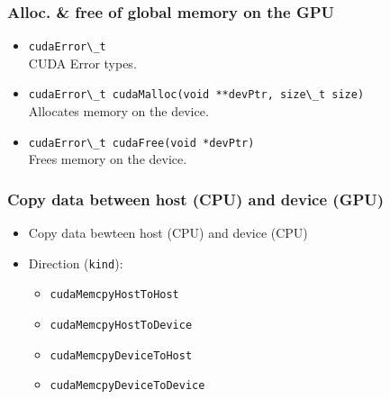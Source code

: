 \begin{frame}
   \frametitle{Alloc. \& free of global memory on the GPU}
   \begin{itemize}
         \item \lstinline[style=MyCudaStyle]|cudaError\_t| \\
		 CUDA Error types.
	 \item \lstinline[style=MyCudaStyle]|cudaError\_t cudaMalloc(void **devPtr, size\_t size)| \\
		 Allocates memory on the device.
	 \item \lstinline[style=MyCudaStyle]|cudaError\_t cudaFree(void *devPtr)| \\
		 Frees memory on the device.
   \end{itemize}
\end{frame} 

\begin{frame}
   
\end{frame}	


\begin{frame}
   \frametitle{Copy data between host (CPU) and device (GPU)}
       \begin{itemize}
          \item Copy data bewteen host (CPU) and device (CPU) \\		       
                
  	  \item Direction (\lstinline[style=MyCudaStyle]|kind|):
             \begin{itemize}
	        \item \lstinline[style=MyCudaStyle]|cudaMemcpyHostToHost|		     
                \item \lstinline[style=MyCudaStyle]|cudaMemcpyHostToDevice|
	        \item \lstinline[style=MyCudaStyle]|cudaMemcpyDeviceToHost|
	        \item \lstinline[style=MyCudaStyle]|cudaMemcpyDeviceToDevice|		
             \end{itemize}			     
       \end{itemize}		  
\end{frame} 

\begin{frame}
   
\end{frame}


